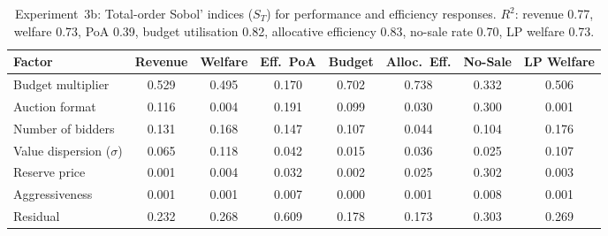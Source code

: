 \begin{table}[H]
\centering
\caption{Experiment~3b: Total-order Sobol' indices ($S_T$) for performance and efficiency responses. $R^2$: revenue 0.77, welfare 0.73, PoA 0.39, budget utilisation 0.82, allocative efficiency 0.83, no-sale rate 0.70, LP welfare 0.73.}
\label{tab:sens_exp3b_primary}
\small
\begin{tabular}{l ccccccc}
\toprule
Factor & Revenue & Welfare & Eff.\ PoA & Budget & Alloc.\ Eff. & No-Sale & LP Welfare \\
\midrule
Budget multiplier         & 0.529 & 0.495 & 0.170 & 0.702 & 0.738 & 0.332 & 0.506 \\
Auction format            & 0.116 & 0.004 & 0.191 & 0.099 & 0.030 & 0.300 & 0.001 \\
Number of bidders         & 0.131 & 0.168 & 0.147 & 0.107 & 0.044 & 0.104 & 0.176 \\
Value dispersion ($\sigma$) & 0.065 & 0.118 & 0.042 & 0.015 & 0.036 & 0.025 & 0.107 \\
Reserve price             & 0.001 & 0.004 & 0.032 & 0.002 & 0.025 & 0.302 & 0.003 \\
Aggressiveness            & 0.001 & 0.001 & 0.007 & 0.000 & 0.001 & 0.008 & 0.001 \\
\midrule
Residual                  & 0.232 & 0.268 & 0.609 & 0.178 & 0.173 & 0.303 & 0.269 \\
\bottomrule
\end{tabular}
\end{table}

\begin{table}[H]
\centering
\caption{Experiment~3b: Total-order Sobol' indices ($S_T$) for stability and dynamics responses. $R^2$: pacing stability 0.88, entropy 0.80, warm start 0.03, inter-episode volatility 0.61, bid-to-value 0.89, bid suppression 0.89, cross-episode drift 0.05.}
\label{tab:sens_exp3b_secondary}
\small
{}
\end{table}
